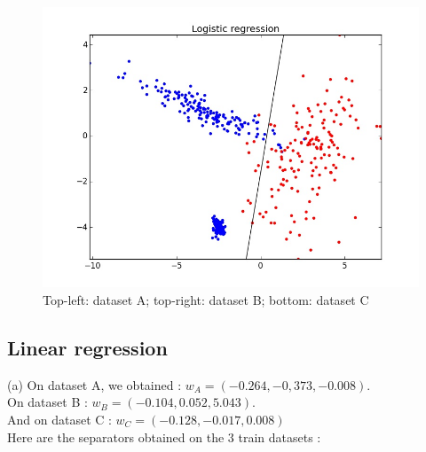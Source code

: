 \documentclass[11pt,a4paper]{article}
\begin{document}
\begin{figure}[H]
\noindent\includegraphics[scale=0.2]{images/logistic_C.jpeg}
\caption{Top-left: dataset A; top-right: dataset B; bottom: dataset C}
\end{figure}

\subsection{Linear regression}
%
\hspace*{-6mm}(a) On dataset A, we obtained : $w_A = (-0.264, -0,373, -0.008)$.
\\On dataset B : $w_B = (-0.104, 0.052, 5.043)$.
\\And on dataset C : $w_C = (-0.128, -0.017, 0.008)$
%
%
\\[5mm]Here are the separators obtained on the 3 train datasets : 
\end{document}
